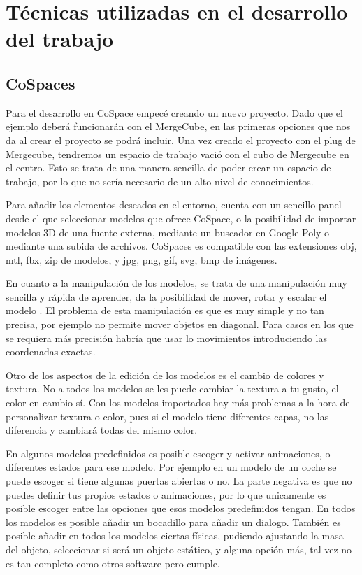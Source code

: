\section{Técnicas utilizadas en el desarrollo del trabajo}

\subsection{CoSpaces}
Para el desarrollo en CoSpace empecé creando un nuevo proyecto. Dado que el ejemplo deberá funcionarán con el MergeCube, en las primeras opciones que nos da al crear el proyecto se podrá incluir.
Una vez creado el proyecto con el plug de Mergecube, tendremos un espacio de trabajo vació con el cubo de Mergecube en el centro. Esto se trata de una manera sencilla de poder crear un espacio de trabajo, por lo que no sería necesario de un alto nivel de conocimientos.

Para añadir los elementos deseados en el entorno, cuenta con un sencillo panel desde el que seleccionar modelos que ofrece CoSpace, o la posibilidad de importar modelos 3D de una fuente externa, mediante un buscador en Google Poly o mediante una subida de archivos. CoSpaces es compatible con las extensiones obj, mtl, fbx, zip de modelos, y jpg, png, gif, svg, bmp de imágenes.

En cuanto a la manipulación de los modelos, se trata de una manipulación muy sencilla y rápida de aprender, da la posibilidad de mover, rotar y escalar el modelo . El problema de esta manipulación es que es muy simple y no tan precisa, por ejemplo no permite mover objetos en diagonal. Para casos en los que se requiera más precisión habría que usar lo movimientos introduciendo las coordenadas exactas.

Otro de los aspectos de la edición de los modelos es el cambio de colores y textura. No a todos los modelos se les puede cambiar la textura a tu gusto, el color en cambio sí. Con los modelos importados hay más problemas a la hora de personalizar textura o color, pues si el modelo tiene diferentes capas, no las diferencia y cambiará todas del mismo color. 

En algunos modelos predefinidos es posible escoger y activar animaciones, o diferentes estados para ese modelo. Por ejemplo en un modelo de un coche se puede escoger si tiene algunas puertas abiertas o no. La parte negativa es que no puedes definir tus propios estados o animaciones, por lo que unicamente es posible escoger entre las opciones que esos modelos predefinidos tengan. En todos los modelos es posible añadir un bocadillo para añadir un dialogo. También es posible añadir en todos los modelos ciertas físicas, pudiendo ajustando la masa del objeto, seleccionar si será un objeto estático, y alguna opción más, tal vez no es tan completo como otros software pero cumple.

